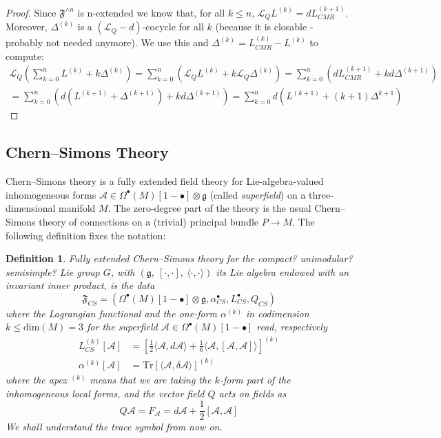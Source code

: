 \documentclass[a4paper,reqno]{amsart}
\newtheorem{definition}{Definition}
\newcommand{\cA}{\mathcal{A}}
\newcommand{\LQ}{\mathcal{L}_{Q}}
\begin{document}
\begin{proof} Since $\mathfrak{F}^{\wedge n}$ is n-extended we know that, for all $k\leq n$, $\LQ L^{(k)}=d L_{CMR}^{(k+1)}$. Moreover, $\Delta^{(k)}$ is a $(\LQ-d)$-cocycle for all $k$ ({\color{blue}because it is closable - probably not needed anymore}). We use this and $\Delta^{(k)}=L_{CMR}^{(k)} - L^{(k)}$ to compute:
\begin{multline*}
\LQ\left(\sum_{k=0}^n L^{(k)} + k \Delta^{(k)}\right) = \sum_{k=0}^n \left( \LQ L^{(k)} + k\LQ\Delta^{(k)}\right)= \sum_{k=0}^n\left(dL_{CMR}^{(k+1)} + k d\Delta^{(k+1)}\right) \\
 = \sum_{k=0}^n\left(d\left(L^{(k+1)}+\Delta^{(k+1)}\right) + k d\Delta^{(k+1)}\right) = \sum_{k=0}^n d \left( L^{(k+1)} + (k+1) \Delta^{k+1}\right)
\end{multline*}
\end{proof}


\subsection{Chern--Simons Theory}
Chern--Simons theory is a fully extended field theory for Lie-algebra-valued inhomogeneous forms $\cA\in\Omega^\bullet(M)[1 - \bullet]\otimes\mathfrak{g}$ (called \emph{superfield}) on a three-dimensional manifold $M$. The zero-degree part of the theory is the usual Chern--Simons theory of connections on a (trivial) principal bundle $P\longrightarrow M$. The following definition fixes the notation:

\begin{definition}
Fully extended Chern--Simons theory for the {\color{blue}compact? unimodular? semisimple?} Lie group $G$, with $(\mathfrak{g},\ [\cdot,\cdot],\ \langle \cdot,\cdot \rangle)$ its Lie algebra endowed with an invariant inner product, is the data
$$\mathfrak{F}_{CS}=\left(\Omega^\bullet(M)[1-\bullet]\otimes\mathfrak{g}, \alpha_{CS}^{\bullet}, L^{\bullet}_{CS}, Q_{CS}\right)$$
where the Lagrangian functional and the one-form $\alpha^{(k)}$ in codimension $k\leq \mathrm{dim}(M) = 3$ for the superfield $\cA\in\Omega^\bullet(M)[1 - \bullet]$ read, respectively
\begin{subequations}\begin{align}\label{CSaction}
L^{(k)}_{CS}[\cA]  & = \left[\frac12 \langle\cA, d\cA\rangle + \frac16 \langle\cA, [\cA,\cA]\rangle\right]^{(k)}\\
\alpha^{(k)}[\cA] & =  \mathrm{Tr} \left[\langle\cA, \delta\cA\rangle\right]^{(k)}
\end{align}\end{subequations}
where the apex ${}^{(k)}$ means that we are taking the $k$-form part of the inhomogeneous local forms, and the vector field $Q$ acts on fields as 
\begin{equation}
Q\cA = F_{\cA} = d\cA + \frac12 [\cA,\cA] 
\end{equation}
We shall understand the trace symbol from now on. 
\end{definition}
\end{document}
